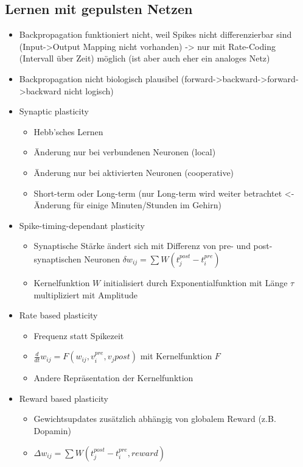 \documentclass[paper=a4, fontsize=11pt]{scrartcl} %
\numberwithin{equation}{section} %
\numberwithin{figure}{section} %
\numberwithin{table}{section} %
\begin{document}
\subsection{Lernen mit gepulsten Netzen}

\begin{itemize}
\item Backpropagation funktioniert nicht, weil Spikes nicht differenzierbar sind (Input->Output Mapping nicht vorhanden) -> nur mit Rate-Coding (Intervall über Zeit) möglich (ist aber auch eher ein analoges Netz)
\item Backpropagation nicht biologisch plausibel (forward->backward->forward->backward nicht logisch)
\item Synaptic plasticity
\begin{itemize}
\item Hebb'sches Lernen
\item Änderung nur bei verbundenen Neuronen (local)
\item Änderung nur bei aktivierten Neuronen (cooperative)
\item Short-term oder Long-term (nur Long-term wird weiter betrachtet <- Änderung für einige Minuten/Stunden im Gehirn)
\end{itemize}
\item Spike-timing-dependant plasticity
\begin{itemize}
\item Synaptische Stärke ändert sich mit Differenz von pre- und post-synaptischen Neuronen $\delta w_{ij} = \sum W(t_j^{post} - t_i^{pre})$
\item Kernelfunktion $W$ initialisiert durch Exponentialfunktion mit Länge $\tau$ multipliziert mit Amplitude
\end{itemize}
\item Rate based plasticity
\begin{itemize}
\item Frequenz statt Spikezeit
\item $\frac{d}{dt}w_{ij} = F(w_{ij}, v_i^{pre},v_j{post})$ mit Kernelfunktion $F$
\item Andere Repräsentation der Kernelfunktion
\end{itemize}
\item Reward based plasticity
\begin{itemize}
\item Gewichtsupdates zusätzlich abhängig von globalem Reward (z.B. Dopamin)
\item $\Delta w_{ij} = \sum W(t_j^{post} - t_i^{pre}, reward)$

\end{itemize}
\end{itemize}
\end{document}
